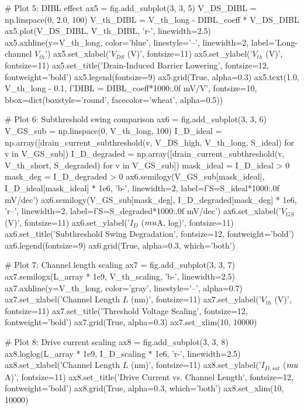 \documentclass[a4paper, 11pt]{article}
\begin{document}
\begin{pycode}
# Plot 5: DIBL effect
ax5 = fig.add_subplot(3, 3, 5)
V_DS_DIBL = np.linspace(0, 2.0, 100)
V_th_DIBL = V_th_long - DIBL_coeff * V_DS_DIBL
ax5.plot(V_DS_DIBL, V_th_DIBL, 'r-', linewidth=2.5)
ax5.axhline(y=V_th_long, color='blue', linestyle='--', linewidth=2, label='Long-channel $V_{th}$')
ax5.set_xlabel('$V_{DS}$ (V)', fontsize=11)
ax5.set_ylabel('$V_{th}$ (V)', fontsize=11)
ax5.set_title('Drain-Induced Barrier Lowering', fontsize=12, fontweight='bold')
ax5.legend(fontsize=9)
ax5.grid(True, alpha=0.3)
ax5.text(1.0, V_th_long - 0.1, f'DIBL = {DIBL_coeff*1000:.0f} mV/V', fontsize=10,
         bbox=dict(boxstyle='round', facecolor='wheat', alpha=0.5))

# Plot 6: Subthreshold swing comparison
ax6 = fig.add_subplot(3, 3, 6)
V_GS_sub = np.linspace(0, V_th_long, 100)
I_D_ideal = np.array([drain_current_subthreshold(v, V_DS_high, V_th_long, S_ideal) for v in V_GS_sub])
I_D_degraded = np.array([drain_current_subthreshold(v, V_th_short, S_degraded) for v in V_GS_sub])
mask_ideal = I_D_ideal > 0
mask_deg = I_D_degraded > 0
ax6.semilogy(V_GS_sub[mask_ideal], I_D_ideal[mask_ideal] * 1e6, 'b-', linewidth=2,
             label=f'S={S_ideal*1000:.0f} mV/dec')
ax6.semilogy(V_GS_sub[mask_deg], I_D_degraded[mask_deg] * 1e6, 'r--', linewidth=2,
             label=f'S={S_degraded*1000:.0f} mV/dec')
ax6.set_xlabel('$V_{GS}$ (V)', fontsize=11)
ax6.set_ylabel('$I_D$ ($\\mu$A, log)', fontsize=11)
ax6.set_title('Subthreshold Swing Degradation', fontsize=12, fontweight='bold')
ax6.legend(fontsize=9)
ax6.grid(True, alpha=0.3, which='both')

# Plot 7: Channel length scaling
ax7 = fig.add_subplot(3, 3, 7)
ax7.semilogx(L_array * 1e9, V_th_scaling, 'b-', linewidth=2.5)
ax7.axhline(y=V_th_long, color='gray', linestyle='--', alpha=0.7)
ax7.set_xlabel('Channel Length $L$ (nm)', fontsize=11)
ax7.set_ylabel('$V_{th}$ (V)', fontsize=11)
ax7.set_title('Threshold Voltage Scaling', fontsize=12, fontweight='bold')
ax7.grid(True, alpha=0.3)
ax7.set_xlim(10, 10000)

# Plot 8: Drive current scaling
ax8 = fig.add_subplot(3, 3, 8)
ax8.loglog(L_array * 1e9, I_D_scaling * 1e6, 'r-', linewidth=2.5)
ax8.set_xlabel('Channel Length $L$ (nm)', fontsize=11)
ax8.set_ylabel('$I_{D,sat}$ ($\\mu$A)', fontsize=11)
ax8.set_title('Drive Current vs. Channel Length', fontsize=12, fontweight='bold')
ax8.grid(True, alpha=0.3, which='both')
ax8.set_xlim(10, 10000)


\end{pycode}
\end{document}
